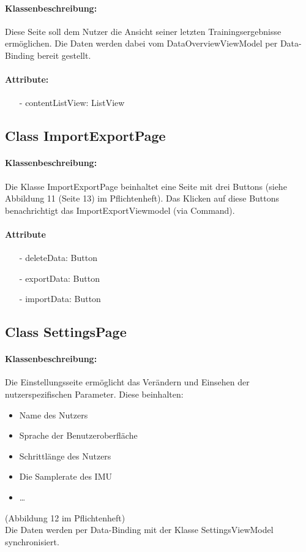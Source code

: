 \documentclass[a4paper,12pt]{article}
\begin{document}
		\paragraph{Klassenbeschreibung:}
		Diese Seite soll dem Nutzer die Ansicht seiner letzten Trainingsergebnisse ermöglichen.
		Die Daten werden dabei vom DataOverviewViewModel per Data-Binding bereit gestellt.
		\paragraph{Attribute:}
		\begin{itemize}
			\item[-] contentListView: ListView
		\end{itemize}

	\subsection{Class ImportExportPage}
		\paragraph{Klassenbeschreibung:}
		Die Klasse ImportExportPage beinhaltet eine Seite mit drei Buttons (siehe Abbildung 11 (Seite 13) im Pflichtenheft).
		Das Klicken auf diese Buttons benachrichtigt das ImportExportViewmodel (via Command).
		\paragraph{Attribute}
		\begin{itemize}
			\item [-]deleteData: Button
			\item [-]exportData: Button
			\item [-]importData: Button
		\end{itemize}

	\subsection{Class SettingsPage}
		\paragraph{Klassenbeschreibung:}
		Die Einstellungsseite ermöglicht das Verändern und Einsehen der nutzerspezifischen Parameter.
		Diese beinhalten:
		\begin{itemize}
			\item Name des Nutzers
			\item Sprache der Benutzeroberfläche
			\item Schrittlänge des Nutzers
			\item Die Samplerate des \Gls{IMU}
			\item \dots
		\end{itemize}
		(Abbildung 12 im Pflichtenheft)\\
		Die Daten werden per Data-Binding mit der Klasse SettingsViewModel synchronisiert.
\end{document}
